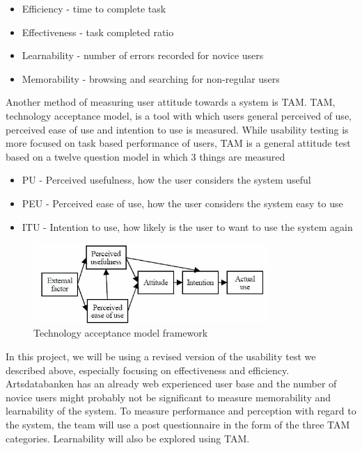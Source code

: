 \begin{itemize}
\item Efficiency - time to complete task
\item Effectiveness - task completed ratio
\item Learnability - number of errors recorded for novice users
\item Memorability - browsing and searching for non-regular users
\end{itemize}

Another method of measuring user attitude towards a system is TAM.
TAM, technology acceptance model, is a tool with which users general perceived of use, perceived ease of use and intention to use is measured. While usability testing is more focused on  task based performance of users\cite{tam:doc4}, TAM is a general attitude test based on a twelve question model in which 3 things are measured

\begin{itemize}
\item PU - Perceived usefulness, how the user considers the system useful
\item PEU - Perceived ease of use, how the user considers the system easy to use
\item ITU - Intention to use, how likely is the user to want to use the system again
\end{itemize}

\begin{figure}[htb]
	\centering
	\includegraphics[width=0.8\textwidth]{reqspec/tam.png}
	\caption{Technology acceptance model framework\cite{tam:doc4}}
	\label{fig:tam}
\end{figure}

In this project, we will be using a revised version of the usability test we described above, especially focusing on effectiveness and efficiency. Artsdatabanken has an already web experienced user base and the number of novice users might probably not be significant to measure memorability and learnability of the system.
To measure performance and perception with regard to the system, the team will use a post questionnaire in the form of the three TAM categories. Learnability will also be explored using TAM.

